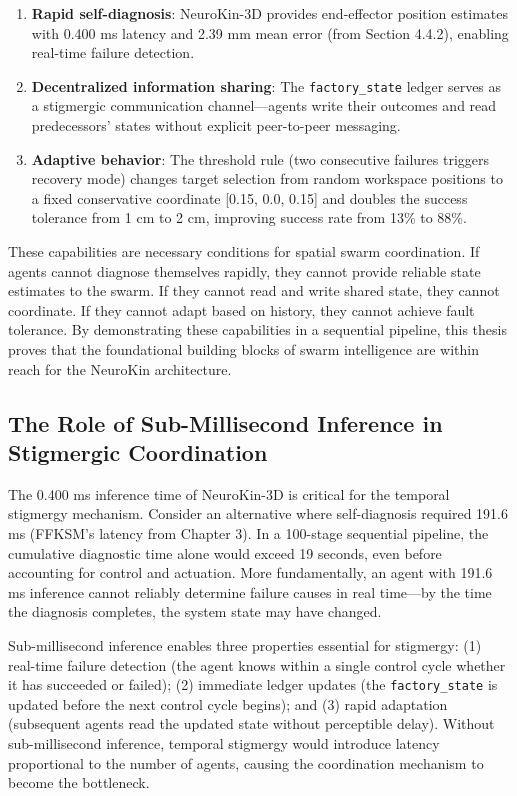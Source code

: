 \documentclass[12pt,a4paper,oneside]{report}
\begin{document}
\begin{enumerate}
    \item \textbf{Rapid self-diagnosis}: NeuroKin-3D provides end-effector position estimates with 0.400 ms latency and 2.39 mm mean error (from Section 4.4.2), enabling real-time failure detection.
    \item \textbf{Decentralized information sharing}: The \texttt{factory\_state} ledger serves as a stigmergic communication channel—agents write their outcomes and read predecessors' states without explicit peer-to-peer messaging.
    \item \textbf{Adaptive behavior}: The threshold rule (two consecutive failures triggers recovery mode) changes target selection from random workspace positions to a fixed conservative coordinate [0.15, 0.0, 0.15] and doubles the success tolerance from 1 cm to 2 cm, improving success rate from 13\% to 88\%.
\end{enumerate}

These capabilities are necessary conditions for spatial swarm coordination. If agents cannot diagnose themselves rapidly, they cannot provide reliable state estimates to the swarm. If they cannot read and write shared state, they cannot coordinate. If they cannot adapt based on history, they cannot achieve fault tolerance. By demonstrating these capabilities in a sequential pipeline, this thesis proves that the foundational building blocks of swarm intelligence are within reach for the NeuroKin architecture.

\subsection{The Role of Sub-Millisecond Inference in Stigmergic Coordination}

The 0.400 ms inference time of NeuroKin-3D is critical for the temporal stigmergy mechanism. Consider an alternative where self-diagnosis required 191.6 ms (FFKSM's latency from Chapter 3). In a 100-stage sequential pipeline, the cumulative diagnostic time alone would exceed 19 seconds, even before accounting for control and actuation. More fundamentally, an agent with 191.6 ms inference cannot reliably determine failure causes in real time—by the time the diagnosis completes, the system state may have changed.

Sub-millisecond inference enables three properties essential for stigmergy: (1) real-time failure detection (the agent knows within a single control cycle whether it has succeeded or failed); (2) immediate ledger updates (the \texttt{factory\_state} is updated before the next control cycle begins); and (3) rapid adaptation (subsequent agents read the updated state without perceptible delay). Without sub-millisecond inference, temporal stigmergy would introduce latency proportional to the number of agents, causing the coordination mechanism to become the bottleneck.
\end{document}
